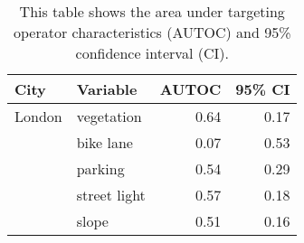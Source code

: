 \begin{table}[!htp]\centering
\caption{This table shows the area under targeting operator characteristics (AUTOC) and 95\% confidence interval (CI).}
\label{result:tab:autoc}
\scriptsize
\begin{tabular}{llrr}\toprule
City & Variable & AUTOC & 95\% CI \\\midrule
London & vegetation & 0.64 & 0.17 \\
 & bike lane & 0.07 & 0.53 \\
 & parking & 0.54 & 0.29 \\
 & street light & 0.57 & 0.18 \\
 & slope & 0.51 & 0.16 \\
\bottomrule
\end{tabular}
\end{table}
